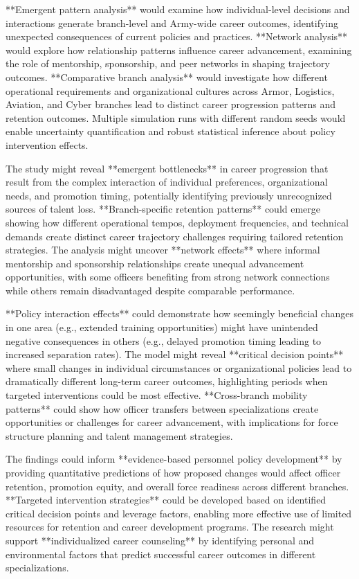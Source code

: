 \documentclass[main.tex]{subfiles}
\begin{document}
**Emergent pattern analysis** would examine how individual-level decisions and interactions generate branch-level and Army-wide career outcomes, identifying unexpected consequences of current policies and practices. **Network analysis** would explore how relationship patterns influence career advancement, examining the role of mentorship, sponsorship, and peer networks in shaping trajectory outcomes. **Comparative branch analysis** would investigate how different operational requirements and organizational cultures across Armor, Logistics, Aviation, and Cyber branches lead to distinct career progression patterns and retention outcomes. Multiple simulation runs with different random seeds would enable uncertainty quantification and robust statistical inference about policy intervention effects.


The study might reveal **emergent bottlenecks** in career progression that result from the complex interaction of individual preferences, organizational needs, and promotion timing, potentially identifying previously unrecognized sources of talent loss. **Branch-specific retention patterns** could emerge showing how different operational tempos, deployment frequencies, and technical demands create distinct career trajectory challenges requiring tailored retention strategies. The analysis might uncover **network effects** where informal mentorship and sponsorship relationships create unequal advancement opportunities, with some officers benefiting from strong network connections while others remain disadvantaged despite comparable performance.

**Policy interaction effects** could demonstrate how seemingly beneficial changes in one area (e.g., extended training opportunities) might have unintended negative consequences in others (e.g., delayed promotion timing leading to increased separation rates). The model might reveal **critical decision points** where small changes in individual circumstances or organizational policies lead to dramatically different long-term career outcomes, highlighting periods when targeted interventions could be most effective. **Cross-branch mobility patterns** could show how officer transfers between specializations create opportunities or challenges for career advancement, with implications for force structure planning and talent management strategies.


The findings could inform **evidence-based personnel policy development** by providing quantitative predictions of how proposed changes would affect officer retention, promotion equity, and overall force readiness across different branches. **Targeted intervention strategies** could be developed based on identified critical decision points and leverage factors, enabling more effective use of limited resources for retention and career development programs. The research might support **individualized career counseling** by identifying personal and environmental factors that predict successful career outcomes in different specializations.
\end{document}
